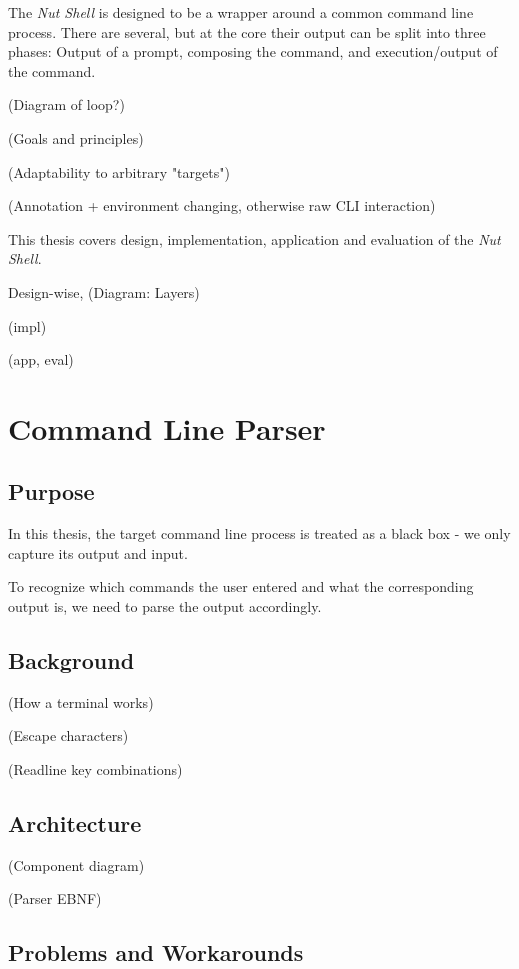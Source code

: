 \documentclass[twoside]{scrreprt}
\begin{document}
The \emph{Nut Shell} is designed to be a wrapper around a common command line process. There are several, but at the core their output can be split into three phases: Output of a prompt, composing the command, and execution/output of the command.

(Diagram of loop?)

(Goals and principles)

    (Adaptability to arbitrary "targets")

    (Annotation + environment changing, otherwise raw CLI interaction)

    This thesis covers design, implementation, application and evaluation of the \emph{Nut Shell}.

    Design-wise, (Diagram: Layers)

    (impl)

    (app, eval)

\section{Command Line Parser}

\subsection{Purpose}

In this thesis, the target command line process is treated as a black box - we only capture its output and input.

To recognize which commands the user entered and what the corresponding output is, we need to parse the output accordingly.

\subsection{Background}

                (How a terminal works)

                (Escape characters)

                (Readline key combinations)

\subsection{Architecture}

                (Component diagram)

                (Parser EBNF)

\subsection{Problems and Workarounds}
\end{document}
